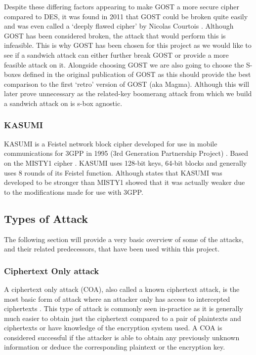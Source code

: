 \documentclass[10pt,journal,compsoc]{IEEEtran}
\begin{document}
Despite these differing factors appearing to make GOST a more secure cipher compared to DES, it was found in 2011 that GOST could be broken quite easily and was even called a ‘deeply flawed cipher’ by Nicolas Courtois \cite{cryptoeprint:2011/211}. 
Although GOST has been considered broken, the attack that would perform this is infeasible. This is why GOST has been chosen for this project as we would like to see if a sandwich attack can either further break GOST or provide a more feasible attack on it. Alongside choosing GOST we are also going to choose the S-boxes defined in the original publication of GOST \cite{rfc8891} as this should provide the best comparison to the first ‘retro’ version of GOST (aka Magma). Although this will later prove unnecessary as the related-key boomerang attack from which we build a sandwich attack on is s-box agnostic.
\subsubsection{KASUMI}
KASUMI is a Feistel network block cipher developed for use in mobile communications for 3GPP in 1995 (3rd Generation Partnership Project) \cite{kasumispec}. Based on the MISTY1 cipher \cite{10.1007/BFb0052334}. KASUMI uses 128-bit keys, 64-bit blocks and generally uses 8 rounds of its Feistel function. Although \cite{cryptoeprint:2004/094} states that KASUMI was developed to be stronger than MISTY1  \cite{C:DunKelSha10} showed that it was actually weaker due to the modifications made for use with 3GPP.
\subsection{Types of Attack}
The following section will provide a very basic overview of some of the attacks, and their related predecessors, that have been used within this project. 

\subsubsection{Ciphertext Only attack}
A ciphertext only attack (COA), also called a known ciphertext attack, is the most basic form of attack where an attacker only has access to intercepted ciphertexts \cite{Katz2007-mm}. This type of attack is commonly seen in-practice as it is generally much easier to obtain just the ciphertext compared to a pair of plaintexts and ciphertexts or have knowledge of the encryption system used. A COA is considered successful if the attacker is able to obtain any previously unknown information or deduce the corresponding plaintext or the encryption key.
\end{document}
